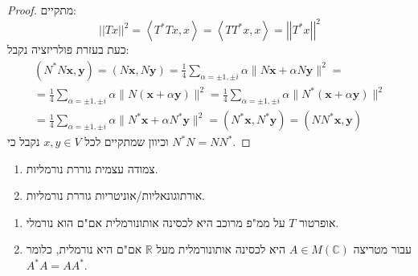\documentclass{tstextbook}
\begin{document}
\begin{proof}
מתקיים:
$$\left\vert\left\vert T x\right\vert\right\vert^{2}=\left\langle T^{*}T x,x\right\rangle=\left\langle T T^{*}x,x\right\rangle=\left\vert\left\vert T^{*}x\right\vert\right\vert^{2}$$
כעת בעזרת פולריזציה נקבל:
\begin{gather*}\left( N^{*}N\mathbf{x},\mathbf{y} \right)=\left( N\mathbf{x},N\mathbf{y} \right)=\frac{1}{4}\sum_{\alpha=\pm1,\pm i}\alpha\|N\mathbf{x}+\alpha N\mathbf{y}\|^{2}=\\=\frac{1}{4}\sum_{\alpha=\pm1,\pm i}\alpha\|N\left( \mathbf{x}+\alpha\mathbf{y} \right)\|^{2}=\frac{1}{4}\sum_{\alpha=\pm1,\pm i}\alpha\|N^{*}\left( \mathbf{x}+\alpha\mathbf{y} \right)\|^{2}\\=\frac{1}{4}\sum_{\alpha=\pm1,\pm i}\alpha\|N^{*}\mathbf{x}+\alpha N^{*}\mathbf{y}\|^{2}=\left( N^{*}\mathbf{x},N^{*}\mathbf{y} \right)=\left( NN^{*}\mathbf{x},\mathbf{y} \right) 
\end{gather*}
וכיוון שמתקיים לכל \(x,y \in V\) נקבל כי \(N^{*}N=N N^{*}\).

\end{proof}
\begin{proposition}
  \begin{enumerate}
    \item צמודה עצמית גוררת נורמליות. 


    \item אורתוגונאליות/אוניטריות גוררת נורמליות. 


  \end{enumerate}
\end{proposition}
\begin{theorem}
  \begin{enumerate}
    \item אופרטור \(T\) על ממ"פ מרוכב היא לכסינה אותונורמלית אם"ם הוא נורמלי. 


    \item עבור מטריצה \(A\in M(\mathbb C)\) היא לכסינה אותונורמלית מעל \(\mathbb R\) אם"ם היא נורמלית, כלומר \(A^* A = A A^*\). 


  \end{enumerate}
\end{theorem}
\end{document}
